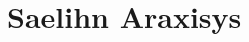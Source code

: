 \begingroup
\newcommand{\Name}{Saelihn}
\newcommand{\LastName}{Araxisys}
\newcommand{\FullName}{\Name{} \LastName{}}
\newcommand{\Race}{Shadar-Kai}
\newcommand{\Class}{Wizard}
\newcommand{\Subclass}{Order of the scribe}
\newcommand{\Mom}{Haera Qlynfir}
\newcommand{\Dad}{Tamnaeth \LastName{}}
\newcommand{\Master}{Mr. Zylgwyn}
\newcommand{\MasterFullName}{Loris Zylgwyn}
\newcommand{\Cloister}{The Zilubania}
\newcommand{\CloisterIntro}{The Cloister '\Cloister{}'}

\part{\FullName}
\label{Wizard}


\clearpage
\endgroup